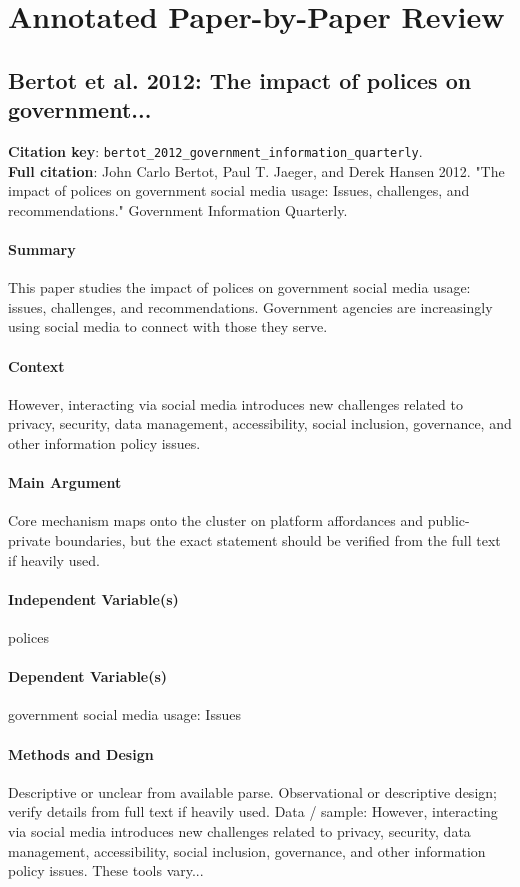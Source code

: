 \documentclass[12pt]{article}
\begin{document}
        \section{Annotated Paper-by-Paper Review}
        \subsection{Bertot et al. 2012: The impact of polices on government...}
\textbf{Citation key}: \texttt{bertot\_2012\_government\_information\_quarterly}.\\
\textbf{Full citation}: John Carlo Bertot, Paul T. Jaeger, and Derek Hansen 2012. "The impact of polices on government social media usage: Issues, challenges, and recommendations." Government Information Quarterly.

\paragraph{Summary} This paper studies the impact of polices on government social media usage: issues, challenges, and recommendations. Government agencies are increasingly using social media to connect with those they serve.

\paragraph{Context} However, interacting via social media introduces new challenges related to privacy, security, data management, accessibility, social inclusion, governance, and other information policy issues.

\paragraph{Main Argument} Core mechanism maps onto the cluster on platform affordances and public-private boundaries, but the exact statement should be verified from the full text if heavily used.

\paragraph{Independent Variable(s)} polices

\paragraph{Dependent Variable(s)} government social media usage: Issues

\paragraph{Methods and Design} Descriptive or unclear from available parse. Observational or descriptive design; verify details from full text if heavily used. Data / sample: However, interacting via social media introduces new challenges related to privacy, security, data management, accessibility, social inclusion, governance, and other information policy issues. These tools vary...
\end{document}
